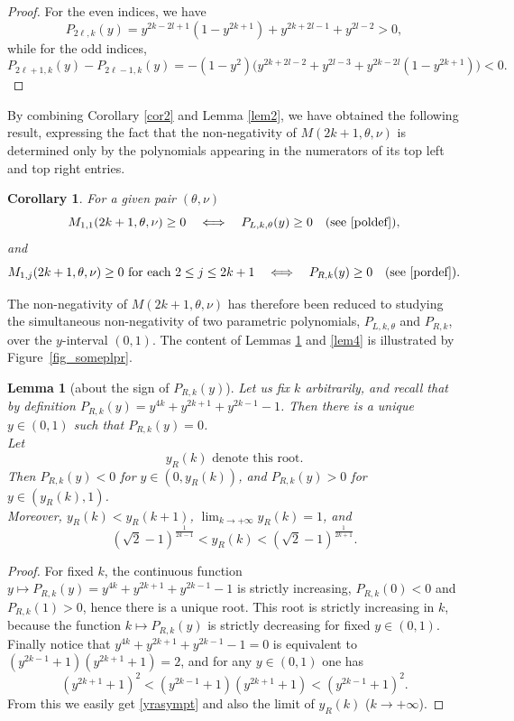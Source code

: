 \documentclass[a4paper]{article}
\newtheorem{lemma}{Lemma}
\newtheorem{corollary}{Corollary}
\newcommand{\te}{\theta}
\newcommand{\yr}{y_R(k)}
\newcommand{\Por}{P_{R,k}(y)}
\newcommand{\Pol}{P_{L,k,\te}(y)}
\begin{document}
\begin{proof} For the even indices, we have
\[
P_{2\ell,k}(y)=y^{2 k-2 l+1}(1-y^{2 k+1})+y^{2 k+2 l-1}+y^{2 l-2}>0,\]
while for the odd indices,
\[
P_{2\ell+1,k}(y)-P_{2\ell-1,k}(y)=-(1 - y^2)\Big(y^{2 k+2 l-2}+y^{2 l-3}+y^{2 k-2 l}(1-y^{2k+1})\Big)<0.
\] 
\end{proof}
By combining Corollary \ref{cor2} and Lemma \ref{lem2}, we have obtained the following result, expressing the fact that the non-negativity of $M(2k+1,\te,\nu)$ is determined only by the polynomials appearing in the numerators of its top left and top right entries.
\begin{corollary}\label{cor3} For a given pair $(\te,\nu)$
\[
M_{1,1}(2k+1,\te,\nu)\ge 0 \quad \Longleftrightarrow \quad \Pol\ge 0 \quad \text{(see } \eqref{poldef}\text{)},
\]
and
\[
M_{1,j}(2k+1,\te,\nu)\ge 0 \text{  for each } 2\le j\le 2k+1 \quad \Longleftrightarrow \quad
\Por\ge 0\quad\text{(see }\eqref{pordef}\text{)}.
\]
\end{corollary}
The non-negativity of $M(2k+1,\te,\nu)$ has therefore been reduced to studying the simultaneous non-negativity of two parametric polynomials, $P_{L,k,\te}$ and $P_{R,k}$, over the $y$-interval $(0,1)$. The content of Lemmas \ref{lem3} and \ref{lem4} is illustrated by Figure~\ref{fig_someplpr}.
\begin{lemma}[about the sign of $\Por$]\label{lem3}
Let us fix $k$ arbitrarily, and recall that by definition $\Por=y^{4 k}+y^{2 k+1}+y^{2 k-1}-1$. Then there is a unique $y\in(0,1)$ such that $\Por=0$.\\ 
Let 
\begin{equation}\label{yrdef}\yr \text{ denote this root.}\end{equation} 
Then $\Por<0$ for $y\in(0,\yr)$, and $\Por>0$ for $y\in(\yr,1)$.\\
Moreover, $\yr<y_R(k+1)$, $\lim_{k\to+\infty} \yr=1$, and
\begin{equation}\label{yrasympt}
\left(\sqrt{2}-1\right)^{\frac{1}{2 k-1}}<\yr < \left(\sqrt{2}-1\right)^{\frac{1}{2 k+1}}.
\end{equation}
\end{lemma}
\begin{proof}
For fixed $k$, the continuous function $y\mapsto\Por=y^{4 k}+y^{2 k+1}+y^{2 k-1}-1$ is strictly increasing, 
$P_{R,k}(0)<0$ and $P_{R,k}(1)>0$, hence there is a unique root. This root is strictly increasing in $k$, because the function $k\mapsto\Por$ is strictly decreasing for fixed $y\in(0,1)$. Finally notice that 
$y^{4 k}+y^{2 k+1}+y^{2 k-1}-1=0$ is equivalent to $\left(y^{2 k-1}+1\right) \left(y^{2 k+1}+1\right)=2$,
and for any $y\in(0,1)$ one has
\[
\left(y^{2 k+1}+1\right)^2<\left(y^{2 k-1}+1\right) \left(y^{2 k+1}+1\right)<\left(y^{2 k-1}+1\right)^2.
\]
From this we easily get \eqref{yrasympt} and also the limit of $\yr$ ($k\to +\infty$).
\end{proof}
\end{document}
